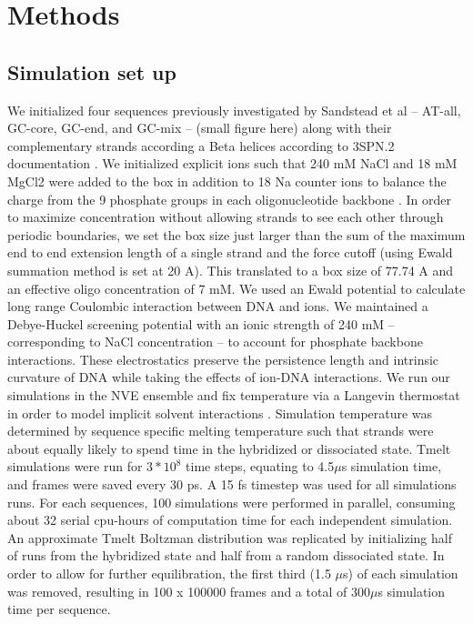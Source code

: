 \documentclass[journal=jpcbfk,manuscript=article]{achemso}
\begin{document}
\section{\label{sec:methods}Methods}


\subsection{\label{sec:methods}Simulation set up}

We initialized four sequences previously investigated by Sandstead et al \citep{Sanstead2016} -- AT-all, GC-core, GC-end, and GC-mix -- (small figure here) along with their complementary strands according a Beta helices according to 3SPN.2 documentation \citep{Phys2014}. We initialized explicit ions such that 240 mM NaCl and 18 mM MgCl2 were added to the box in addition to 18 Na counter ions to balance the charge from the 9 phosphate groups in each oligonucleotide backbone \citep{Hinckley2015}. In order to maximize concentration without allowing strands to see each other through periodic boundaries, we set the box size just larger than the sum of the maximum end to end extension length of a single strand and the force cutoff (using Ewald summation method is set at 20 A). This translated to a box size of 77.74 A and an effective oligo concentration of 7 mM. We used an Ewald potential to calculate long range Coulombic interaction between DNA and ions. We maintained a Debye-Huckel screening potential with an ionic strength of 240 mM -- corresponding to NaCl concentration -- to account for phosphate backbone interactions. These electrostatics preserve the persistence length and intrinsic curvature of DNA while taking the effects of ion-DNA interactions\citep{Hinckley2015}. We run our simulations in the NVE ensemble and fix temperature via a Langevin thermostat in order to model implicit solvent interactions \citep{Schneider1978Molecular-dynamicsTransitions}. Simulation temperature was determined by sequence specific melting temperature such that strands were about equally likely to spend time in the hybridized or dissociated state. Tmelt simulations were run for $3*10^{8}$ time steps, equating to 4.5$\mu$s simulation time, and frames were saved every 30 ps. A 15 fs timestep was used for all simulations runs. For each sequences, 100 simulations were performed in parallel, consuming about 32 serial cpu-hours of computation time for each independent simulation. An approximate Tmelt Boltzman distribution was replicated by initializing half of runs from the hybridized state and half from a random dissociated state. In order to allow for further equilibration, the first third (1.5 $\mu$s) of each simulation was removed, resulting in 100 x 100000 frames and a total of 300$\mu$s simulation time per sequence.
\end{document}
